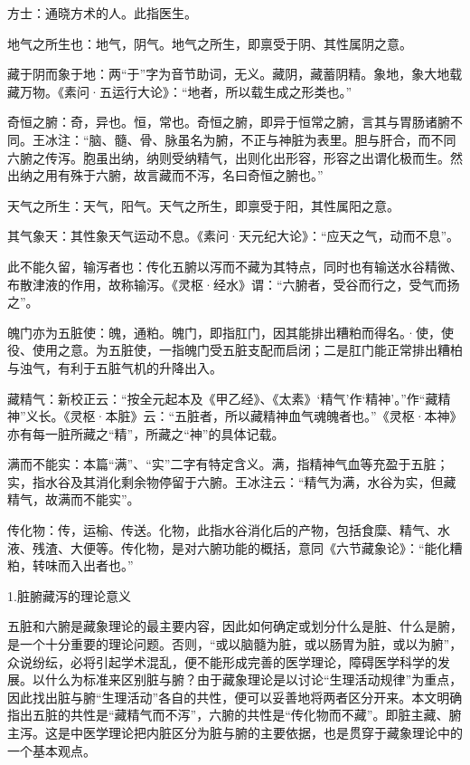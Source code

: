 \documentclass[12pt]{ctexbook}
\begin{document}

\begin{jiaozhu}
	\item 方士：通晓方术的人。此指医生。
	\item 地气之所生也：地气，阴气。地气之所生，即禀受于阴、其性属阴之意。
	\item 藏于阴而象于地：两“于”字为音节助词，无义。藏阴，藏蓄阴精。象地，象大地载藏万物。《素问·五运行大论》：“地者，所以载生成之形类也。”
	\item 奇恒之腑：奇，异也。恒，常也。奇恒之腑，即异于恒常之腑，言其与胃肠诸腑不同。王冰注：“脑、髓、骨、脉虽名为腑，不正与神脏为表里。胆与肝合，而不同六腑之传泻。胞虽出纳，纳则受纳精气，出则化出形容，形容之出谓化极而生。然出纳之用有殊于六腑，故言藏而不泻，名曰奇恒之腑也。”
	\item 天气之所生：天气，阳气。天气之所生，即禀受于阳，其性属阳之意。
	\item 其气象天：其性象天气运动不息。《素问·天元纪大论》：“应天之气，动而不息”。
	\item 此不能久留，输泻者也：传化五腑以泻而不藏为其特点，同时也有输送水谷精微、布散津液的作用，故称输泻。《灵枢·经水》谓：“六腑者，受谷而行之，受气而扬之”。
	\item 魄门亦为五脏使：魄，通粕。魄门，即指肛门，因其能排出糟粕而得名。·使，使役、使用之意。为五脏使，一指魄门受五脏支配而启闭；二是肛门能正常排出糟柏与浊气，有利于五脏气机的升降出入。
	\item 藏精气：新校正云：“按全元起本及《甲乙经》、《太素》‘精气’作‘精神’。”作“藏精神”义长。《灵枢·本脏》云：“五脏者，所以藏精神血气魂魄者也。”《灵枢·本神》亦有每一脏所藏之“精”，所藏之“神”的具体记载。
	\item 满而不能实：本篇“满”、“实”二字有特定含义。满，指精神气血等充盈于五脏；实，指水谷及其消化剩余物停留于六腑。王冰注云：“精气为满，水谷为实，但藏精气，故满而不能实”。
	\item 传化物：传，运榆、传送。化物，此指水谷消化后的产物，包括食糜、精气、水液、残渣、大便等。传化物，是对六腑功能的概括，意同《六节藏象论》：“能化糟粕，转味而入出者也。”
\end{jiaozhu}


1.脏腑藏泻的理论意义

五脏和六腑是藏象理论的最主要内容，因此如何确定或划分什么是脏、什么是腑，是一个十分重要的理论问题。否则，“或以脑髓为脏，或以肠胃为脏，或以为腑”，众说纷纭，必将引起学术混乱，便不能形成完善的医学理论，障碍医学科学的发展。以什么为标准来区别脏与腑？由于藏象理论是以讨论“生理活动规律”为重点，因此找出脏与腑“生理活动”各自的共性，便可以妥善地将两者区分开来。本文明确指出五脏的共性是“藏精气而不泻”，六腑的共性是“传化物而不藏”。即脏主藏、腑主泻。这是中医学理论把内脏区分为脏与腑的主要依据，也是贯穿于藏象理论中的一个基本观点。
\end{document}
